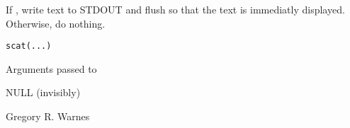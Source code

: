 \begin{Description}\relax
If , write text to STDOUT and flush so
that the text is immediatly displayed. Otherwise, do nothing.
\end{Description}
\begin{Usage}
\begin{verbatim}
scat(...)
\end{verbatim}
\end{Usage}
\begin{Arguments}
\begin{ldescription}
\item[\code{...}] Arguments passed to 
\end{ldescription}
\end{Arguments}
\begin{Value}
NULL (invisibly)
\end{Value}
\begin{Author}\relax
Gregory R. Warnes 
\end{Author}
\begin{SeeAlso}\relax
{}
\end{SeeAlso}
\begin{Examples}
\end{Examples}

